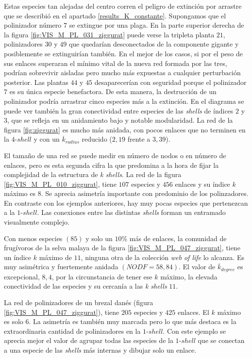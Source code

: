 Estas especies tan alejadas del centro corren el peligro de extinción por arrastre que se describió en el apartado \ref{results_K_constante}. Supongamos que el polinizador número $7$ se extingue por una plaga. En la parte superior derecha de la figura \ref{fig:VIS_M_PL_031_ziggurat} puede verse la tripleta planta $21$, polinizadores $30$ y $49$ que quedarían desconectados de la componente gigante y posiblemente se extinguirían también. En el mejor de los casos, si por el peso de sus enlaces superaran el mínimo vital de la nueva red formada por las tres, podrían sobrevivir aisladas pero mucho más expuestas a cualquier perturbación posterior. Las plantas $44$ y $45$ desaparecerían con seguridad porque el polinizador $7$ es su única especie benefactora. De esta manera, la destrucción de un polinizador podría arrastrar cinco especies más a la extinción. En el diagrama se puede ver también la gran conectividad entre especies de las \textit{shells} de índices $2$ y $3$, que se refleja en un anidamiento bajo y notable modularidad. La red de la figura \ref{fig:ziggurat} es mucho más anidada, con pocos enlaces que no terminen en la $4$-$shell$ y con un $\overline k_{radius}$ reducido ($2,19$ frente a $3,39$).


El tamaño de una red se puede medir en número de nodos o en número de enlaces, pero es esta segunda cifra la que predomina a la hora de fijar la complejidad de la estructura de \textit{k shells}. La red de la figura \ref{fig:VIS_M_PL_010_ziggurat}, tiene $107$ especies y $456$ enlaces y su índice $k$ máximo es $8$. Se aprecia asimetría importante con predominio de los polinzadores. En contraste con los ejemplos anteriores, hay muy pocas especies que pertenezcan a la $1$-$shell$. Las conexiones entre las distintas \textit{shells} forman un entramado visualmente complejo.

Con menos especies $(85)$ y solo un $10\%$ más de enlaces, la comunidad de frugívoros de la selva malaya de la figura \ref{fig:VIS_M_PL_047_ziggurat}, tiene un índice $k$ máximo de $11$, ninguna otra de la colección \textit{web of life} lo alcanza. Es muy asimétrica y fuertemente anidada $(NODF = 58,84)$. El valor de $\overline k_{degree}$ es excepcional, $8,4$, por la circunstancia de tener ese $k$ máximo, la elevada conectividad de las especies y su cercanía a las \textit{k shells} $11$.

La red de polinizadores de un brezal danés (figura \ref{fig:VIS_M_PL_047_ziggurat}), tiene $205$ especies y $425$ enlaces. El $k$ máximo es solo $6$. La asimetría es también muy marcada pero lo que más destaca es la extraordinaria cantidad de polinizadores en la $1$-$shell$. Con este ejemplo se aprecia mejor el valor de agrupar todas las especies de la $1$-$shell$ que se conectan a una especie de las \textit{shells} más internas y dibujar solo un enlace. 

